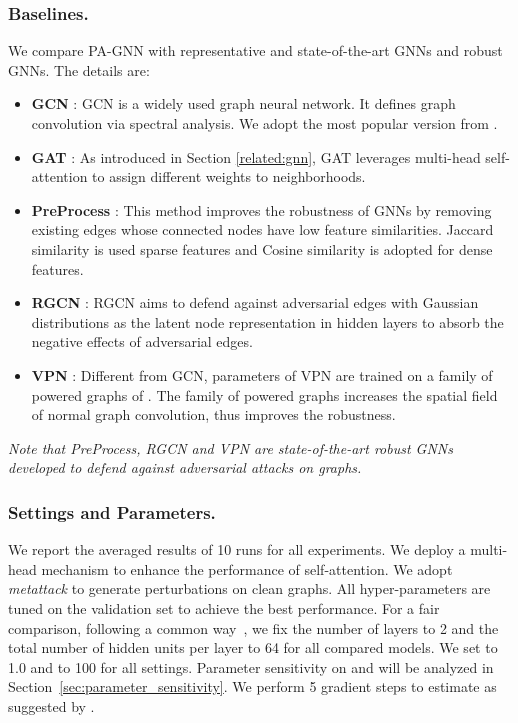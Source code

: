 \documentclass[sigconf]{acmart}
\newcommand{\our}{{PA-GNN}\xspace}
\begin{document}
\subsubsection{Baselines.}
We compare \our with representative and state-of-the-art GNNs and robust GNNs. The details are:
\begin{itemize}[leftmargin=*]
    \item \textbf{GCN} \cite{kipf2016semi}: GCN is a widely used graph neural network. It defines graph convolution via spectral analysis.  We adopt the most popular version from \cite{kipf2016semi}.
    \item \textbf{GAT} \cite{hamilton2017inductive}: As introduced in Section \ref{related:gnn}, GAT leverages multi-head self-attention to assign different weights to neighborhoods.
    \item \textbf{PreProcess} \cite{wu2019adversarial}: This method improves the robustness of GNNs by removing existing edges whose connected nodes have low feature similarities. Jaccard similarity is used sparse features and Cosine similarity is adopted for dense features.
\item \textbf{RGCN} \cite{zhu2019robust}: RGCN aims to defend against adversarial edges with Gaussian distributions as the latent node representation in hidden layers to absorb the negative effects of adversarial edges.
    \item \textbf{VPN} \cite{jin2019power}: Different from GCN, parameters of VPN are trained on a family of powered graphs of . The family of powered graphs increases the spatial field of normal graph convolution, thus improves the robustness.
\end{itemize}
\textit{Note that PreProcess, RGCN and VPN are state-of-the-art robust GNNs developed to defend against adversarial attacks on graphs.}


\subsubsection{Settings and Parameters.} \label{sec:settings_parameters}
We report the averaged results of 10 runs for all experiments. We deploy a multi-head mechanism \cite{vaswani2017attention} to enhance the performance of self-attention. We adopt \textit{metattack} to generate perturbations on clean graphs.
All hyper-parameters are tuned on the validation set to achieve the best performance. For a fair comparison, following a common way~\cite{zhu2019robust}, we fix the number of layers to 2 and the total number of hidden units per layer to 64 for all compared models. 
We set  to 1.0 and  to 100 for all settings. Parameter sensitivity on  and  will be analyzed in Section~\ref{sec:parameter_sensitivity}. We perform  5 gradient steps to estimate  as suggested by \cite{finn2017model}.
\end{document}
